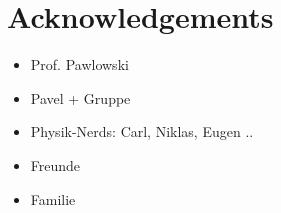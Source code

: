 \chapter*{Acknowledgements}

\begin{itemize}
\item Prof. Pawlowski
\item Pavel + Gruppe
\item Physik-Nerds:  Carl, Niklas, Eugen ..
\item Freunde
\item Familie	
\end{itemize}
